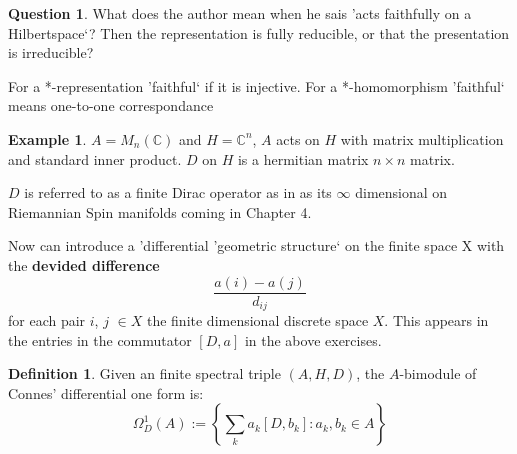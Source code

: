 \documentclass[a4paper]{article}
\newcounter{exercise}
\theoremstyle{definition}
\newtheorem{definition}{Definition}
\theoremstyle{definition}
\newtheorem{question}{Question}
\theoremstyle{definition}
\newtheorem{example}{Example}
\theoremstyle{theorem}
\theoremstyle{theorem}
\begin{document}
\begin{question}
    What does the author mean when he sais 'acts faithfully on a
    Hilbertspace`? Then the representation is fully reducible, or that the
    presentation is irreducible?
    \newline

    For a *-representation 'faithful` if it is injective. For a
    *-homomorphism 'faithful` means one-to-one correspondance
\end{question}

\begin{example}
    $A = M_n(\mathbb{C})$ and $H=\mathbb{C}^n$, $A$ acts on $H$ with matrix
    multiplication and standard inner product. $D$ on $H$ is a hermitian
    matrix $n\times n$ matrix.
\end{example}

$D$ is referred to as a finite Dirac operator as in as its $\infty$
dimensional on Riemannian Spin manifolds coming in Chapter 4.
\newline

Now can introduce a 'differential 'geometric structure` on the finite space X
with the \textbf{devided difference}
\begin{equation}
    \frac{a(i)-a(j)}{d_{ij}}
\end{equation}
for each pair $i$, $j$ $\in X$ the finite dimensional discrete space $X$.
This appears in the entries in the commutator $[D, a]$ in the above
exercises.

\begin{definition}
    Given an finite spectral triple $(A, H, D)$, the $A$-bimodule of
    Connes' differential one form is:
    \begin{equation}
        \Omega _D ^1 (A) := \left\{ \sum _k a_k[D, b_k]: a_k, b_k \in A \right\}
    \end{equation}
\end{definition}
\end{document}
